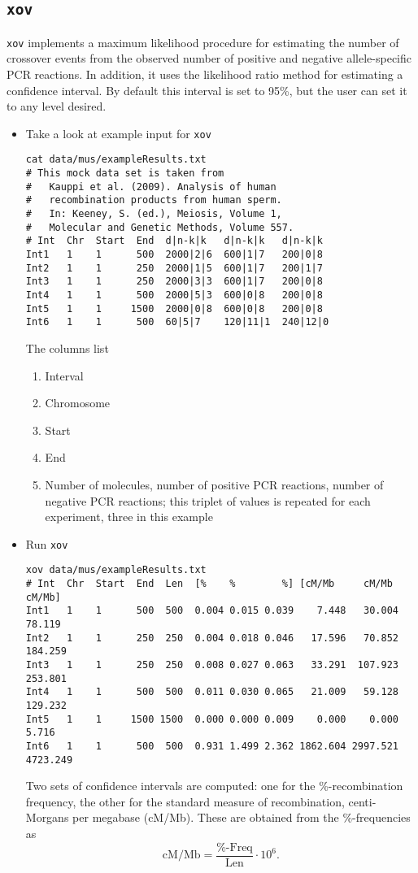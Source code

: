 \documentclass{article}
\newcommand{\ty}{\texttt}
\begin{document}
\begin{itemize}
\subsection{\ty{xov}}
\ty{xov} implements a maximum likelihood procedure for estimating the
number of crossover events from the observed number of positive and
negative allele-specific PCR reactions. In addition, it uses the
likelihood ratio method for estimating a confidence interval. By
default this interval is set to 95\%, but the user can set it to any
level desired.
\begin{itemize}
\item Take a look at example input for \ty{xov}
\begin{lstlisting}
cat data/mus/exampleResults.txt 
# This mock data set is taken from
#   Kauppi et al. (2009). Analysis of human
#   recombination products from human sperm.
#   In: Keeney, S. (ed.), Meiosis, Volume 1,
#   Molecular and Genetic Methods, Volume 557.
# Int  Chr  Start  End  d|n-k|k   d|n-k|k   d|n-k|k
Int1   1    1      500  2000|2|6  600|1|7   200|0|8
Int2   1    1      250  2000|1|5  600|1|7   200|1|7
Int3   1    1      250  2000|3|3  600|1|7   200|0|8
Int4   1    1      500  2000|5|3  600|0|8   200|0|8
Int5   1    1     1500  2000|0|8  600|0|8   200|0|8
Int6   1    1      500  60|5|7    120|11|1  240|12|0
\end{lstlisting}
The columns list
\begin{enumerate}
\item Interval
\item Chromosome
\item Start
\item End
\item Number of molecules, number of positive PCR reactions, number of
  negative PCR reactions; this triplet of values is repeated for each
  experiment, three in this example
\end{enumerate}
\item Run \ty{xov}
\small
\begin{lstlisting}
xov data/mus/exampleResults.txt
# Int  Chr  Start  End  Len  [%    %        %] [cM/Mb     cM/Mb    cM/Mb]
Int1   1    1      500  500  0.004 0.015 0.039    7.448   30.004   78.119
Int2   1    1      250  250  0.004 0.018 0.046   17.596   70.852  184.259
Int3   1    1      250  250  0.008 0.027 0.063   33.291  107.923  253.801
Int4   1    1      500  500  0.011 0.030 0.065   21.009   59.128  129.232
Int5   1    1     1500 1500  0.000 0.000 0.009    0.000    0.000    5.716
Int6   1    1      500  500  0.931 1.499 2.362 1862.604 2997.521 4723.249
\end{lstlisting}
\normalsize
Two sets of confidence intervals are computed: one for the
\%-recombination frequency, the other for the standard measure of
recombination, centi-Morgans per megabase (cM/Mb). These are obtained
from the \%-frequencies as
\[
\mbox{cM/Mb}=\frac{\mbox{\%-Freq}}{\mbox{Len}}\cdot 10^6.
\]
\end{itemize}


\end{itemize}
\end{document}
